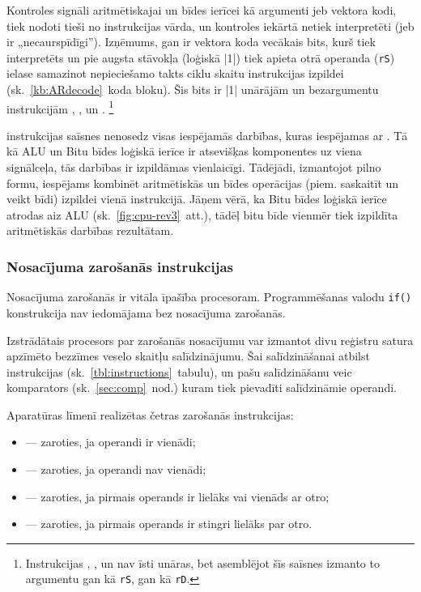 	Kontroles signāli aritmētiskajai un bīdes ierīcei kā argumenti jeb vektora kodi,
	tiek nodoti tieši no instrukcijas vārda, un kontroles iekārtā netiek
	interpretēti (jeb ir „necaurspīdīgi”). Izņēmums, gan ir vektora koda
	vecākais bits, kurš tiek interpretēts un pie augsta stāvokļa (loģiskā |1|)
	tiek apieta otrā operanda (\texttt{rS}) ielase samazinot nepieciešamo
	takts ciklu skaitu instrukcijas izpildei (sk.~\ref{kb:ARdecode}~koda bloku).
	Šis bits ir |1|	unārājām un bezargumentu instrukcijām
	, ,  un .%
	\footnote{Instrukcijas , ,  un 
		nav īsti unāras, bet asemblējot šīs saīsnes izmanto to argumentu gan kā
		\texttt{rS}, gan kā \texttt{rD}.}
	
	\begin{singlespace}
		VHDL},%
		                caption={\mnem{AR} instrukcijas dekodēšana (izgriezums).},%
		                label=kb:ARdecode,%
		                firstnumber=150]
			{code/gen/ardecode-snippet.vhd}
	\end{singlespace}
	
	 instrukcijas saīsnes nenosedz visas iespējamās darbības, kuras
	iespējamas ar . Tā kā ALU un Bitu bīdes loģiskā ierīce ir
	atsevišķas komponentes uz viena signālceļa, tās darbības ir izpildāmas
	vienlaicīgi. Tādējādi, izmantojot  pilno formu, iespējams
	kombinēt aritmētiskās un bīdes operācijas (piem. saskaitīt un veikt bīdi)
	izpildei vienā instrukcijā. Jāņem vērā, ka Bitu bīdes loģiskā ierīce
	atrodas aiz ALU (sk.~\ref{fig:cpu-rev3}~att.),
	tādēļ bitu bīde vienmēr tiek izpildīta aritmētiskās darbības rezultātam.


\subsubsection{Nosacījuma zarošanās instrukcijas} \label{sec:branching}
	Nosacījuma zarošanās ir vitāla īpašība procesoram. Programmēšanas
	valodu \texttt{if()} konstrukcija nav iedomājama bez
	nosacījuma zarošanās.
	
	Izstrādātais procesors par zarošanās nosacījumu var izmantot divu reģistru
	satura apzīmēto bezzīmes veselo skaitļu salīdzinājumu.
	Šai salīdzināšanai atbilst  instrukcijas
	(sk.~\ref{tbl:instructions}~tabulu), un pašu salīdzināšanu veic komparators
	(sk.~\ref{sec:comp}~nod.) kuram tiek pievadīti salīdzināmie operandi.
	
	\pagebreak[2]
	Aparatūras līmenī realizētas četras zarošanās instrukcijas:
	\begin{itemize}
		\item {} — zaroties, ja operandi ir vienādi;
		\item {} — zaroties, ja operandi nav vienādi;
		\item {} — zaroties, ja pirmais operands ir lielāks
			vai vienāds ar otro;
		\item {} — zaroties, ja pirmais operands ir stingri lielāks
			par otro.
	\end{itemize}
	
